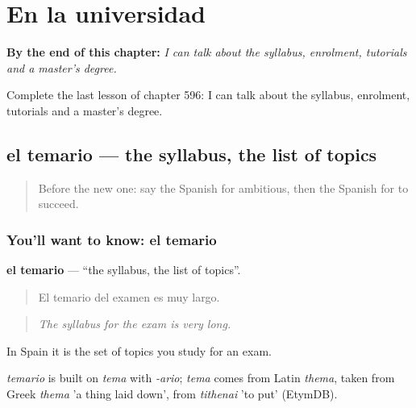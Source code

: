 
\chapter{En la universidad}
\label{ch:es-en-la-universidad}

\begin{chapteropening}
\textbf{By the end of this chapter:} \emph{I can talk about the syllabus, enrolment, tutorials and a master's degree.}

Complete the last lesson of chapter 596: I can talk about the syllabus, enrolment, tutorials and a master's degree.
\end{chapteropening}

\section[el temario]{el temario — the syllabus, the list of topics}

\label{lesson:ES-C596-temario}



\begin{quote}
Before the new one: say the Spanish for ambitious, then the Spanish for to succeed.
\end{quote}

\subsection*{You'll want to know: el temario}
\textbf{el temario} — \textquotedblleft{}the syllabus, the list of topics\textquotedblright{}.

\begin{quote}
El temario del examen es muy largo.
\end{quote}

\begin{quote}
\emph{The syllabus for the exam is very long.}
\end{quote}

In Spain it is the set of topics you study for an exam.

\begin{cousinweb}
\emph{temario} is built on \emph{tema} with \emph{-ario}; \emph{tema} comes from Latin \emph{thema}, taken from Greek \emph{thema} 'a thing laid down', from \emph{tithenai} 'to put' (EtymDB).
\end{cousinweb}

